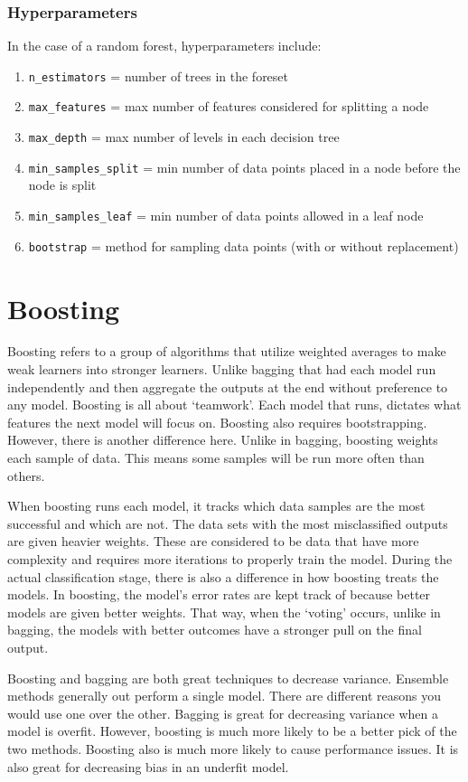 \documentclass{book}
\begin{document}
\subsubsection{Hyperparameters}
In the case of a random forest, hyperparameters include:
\begin{enumerate}
\item \texttt{n\_estimators} = number of trees in the foreset
\item \texttt{max\_features} = max number of features considered for splitting a node
\item \texttt{max\_depth} = max number of levels in each decision tree
\item \texttt{min\_samples\_split} = min number of data points placed in a node before the node is split
\item \texttt{min\_samples\_leaf} = min number of data points allowed in a leaf node
\item \texttt{bootstrap} = method for sampling data points (with or without replacement)
\end{enumerate}

\section{Boosting}
Boosting refers to a group of algorithms that utilize weighted averages to make weak learners into stronger learners. Unlike bagging that had each model run independently and then aggregate the outputs at the end without preference to any model. Boosting is all about `teamwork'. Each model that runs, dictates what features the next model will focus on.
Boosting also requires bootstrapping. However, there is another difference here. Unlike in bagging, boosting weights each sample of data. This means some samples will be run more often than others.

When boosting runs each model, it tracks which data samples are the most successful and which are not. The data sets with the most misclassified outputs are given heavier weights. These are considered to be data that have more complexity and requires more iterations to properly train the model.
During the actual classification stage, there is also a difference in how boosting treats the models. In boosting, the model's error rates are kept track of because better models are given better weights.
That way, when the `voting' occurs, unlike in bagging, the models with better outcomes have a stronger pull on the final output.

Boosting and bagging are both great techniques to decrease variance. Ensemble methods generally out perform a single model. There are different reasons you would use one over the other. Bagging is great for decreasing variance when a model is overfit. However, boosting is much more likely to be a better pick of the two methods. Boosting also is much more likely to cause performance issues. It is also great for decreasing bias in an underfit model. 
\end{document}
